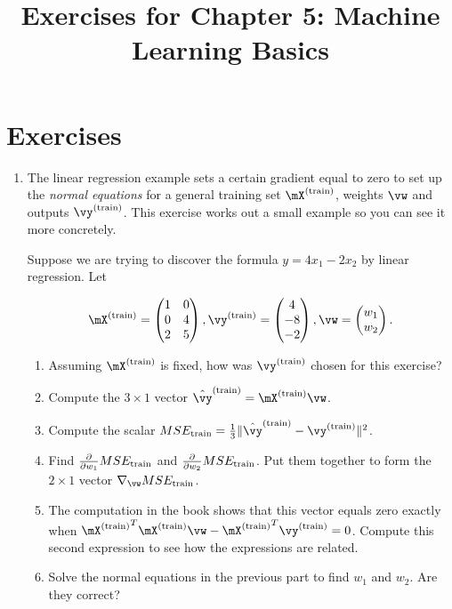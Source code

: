 \documentclass{article}
\title{Exercises for Chapter 5: Machine Learning Basics}
\newcommand{\utrain}{^{\textnormal{(train)}}}
\newcommand{\strain}{_{\textnormal{train}}}
\begin{document}
\maketitle

\section*{Exercises}
\begin{enumerate}
\item The linear regression example sets a certain gradient equal to zero to set up the \emph{normal equations} for a general training set $\mX\utrain$, weights $\vw$ and outputs $\vy\utrain$. This exercise works out a small example so you can see it more concretely.

Suppose we are trying to discover the formula $y = 4x_1 - 2x_2$ by linear regression. Let

\begin{equation*}
  \mX\utrain =  \begin{pmatrix}
                1 & 0 \\
                0 & 4 \\
                2 & 5
                \end{pmatrix}, 
  \vy\utrain =  \begin{pmatrix}
                4 \\
                -8 \\
                -2
                \end{pmatrix},
  \vw           = \begin{pmatrix}
                w_1 \\
                w_2
                \end{pmatrix}.
\end{equation*}                
\begin{enumerate}
    \item Assuming $\mX\utrain$ is fixed, how was $\vy\utrain$ chosen for this exercise?
    \item Compute the $3\times1$ vector $\hat{\vy}\utrain = \mX\utrain\vw$. 
    \item Compute the scalar $MSE\strain = \frac13 \lVert \hat{\vy}\utrain - \vy\utrain \rVert^2$.
    \item Find $\frac{\partial}{\partial w_1} MSE\strain$ and $\frac{\partial}{\partial w_2} MSE\strain$. Put them together to form the $2\times1$ vector $\nabla_\vw MSE\strain$.
    \item The computation in the book shows that this vector equals zero exactly when ${\mX\utrain}^T\mX\utrain\vw - {\mX\utrain}^T\vy\utrain = 0$. Compute this second expression to see how the expressions are related.
    \item Solve the normal equations in the previous part to find $w_1$ and $w_2$. Are they correct?
\end{enumerate}


\end{enumerate}
\end{document}
